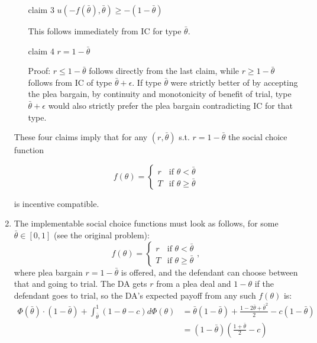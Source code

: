 \documentclass[a4paper]{article}
\begin{document}
\begin{enumerate}
\begin{itemize}
			\item[claim 3] $u(-f(\bar{\theta}),\bar{\theta})\geq -(1-\bar{\theta})$
			
			This follows immediately from IC for type $\bar{\theta}$.
			
			\item[claim 4] $r= 1-\bar{\theta}$
			
			Proof: $r\leq 1-\bar{\theta}$ follows directly from the last claim, while $r\geq 1-\bar{\theta}$ follows from IC of type $\bar{\theta}+\epsilon$. If type $\bar{\theta}$ were strictly better of by accepting the plea bargain, by continuity and monotonicity of benefit of trial, type $\bar{\theta}+\epsilon$ would also strictly prefer the plea bargain contradicting IC for that type.
		\end{itemize}
		
		These four claims  imply that for any $(r,\bar{\theta})$ s.t. $r= 1-\bar{\theta}$ the social choice function
		
		\[ f(\theta)= \begin{cases} r & \text{if } \theta<\bar{\theta} \\
			
			T & \text{if } \theta\geq\bar{\theta} \end{cases} \]
		
		is incentive compatible.
		
		
		
		\item The implementable social choice functions must look as follows, for some $\bar{\theta} \in [0,1]$ (see the original problem):
		\[ f(\theta)= \begin{cases} r & \text{if } \theta<\bar{\theta} \\
			T & \text{if } \theta\geq\bar{\theta} \end{cases}, \]
		where plea bargain $r= 1-\bar{\theta}$ is offered, and the defendant can choose between that and going to trial. 
		The DA gets $r$ from a plea deal and $1-\theta$ if the defendant goes to trial, so the DA's expected payoff from any such $f(\theta)$ is:
		\begin{equation}
			\label{eq:MJD}
			\begin{aligned}
				\Phi(\bar{\theta}) \cdot (1-\bar{\theta})+\int_{\bar{\theta}}^1 (1-\theta-c) d\Phi(\theta)
				&= \bar{\theta} (1-\bar{\theta}) + \frac{1-2\bar{\theta}+\bar{\theta}^2}{2} - c(1-\bar{\theta}) 
				\\&= (1-\bar{\theta}) \left(\frac{1+\bar{\theta}}{2} - c\right)
			\end{aligned}
		\end{equation}
		

\end{enumerate}
\end{document}
